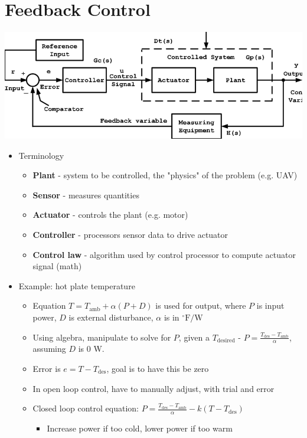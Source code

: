 \documentclass{article}
\begin{document}
\section*{Feedback Control}
\begin{center}
\includegraphics[scale=0.5]{closed-loop.png}
\end{center}
\begin{itemize}
\item Terminology
\begin{itemize}
\item \textbf{Plant}  - system to be controlled, the "physics" of the problem (e.g. UAV)
\item \textbf{Sensor} - measures quantities
\item \textbf{Actuator} - controls the plant (e.g. motor)
\item \textbf{Controller} - processors sensor data to drive actuator
\item \textbf{Control law} - algorithm used by control processor to compute actuator signal (math)
\end{itemize}
\item Example: hot plate temperature
\begin{itemize}
\item Equation $T=T_\text{amb}+\alpha(P+D)$ is used for output, where $P$ is input power, $D$ is external disturbance, $\alpha$ is in $^\circ\text{F}/\text{W}$
\item Using algebra, manipulate to solve for $P$, given a $T_\text{desired}$ - $P=\frac{T_\text{des}-T_\text{amb}}{\alpha}$, assuming $D$ is 0 W.
\item Error is $e=T-T_\text{des}$, goal is to have this be zero
\item In open loop control, have to manually adjust, with trial and error
\item Closed loop control equation:  $P=\frac{T_\text{des}-T_\text{amb}}{\alpha}-k(T-T_\text{des})$
\begin{itemize}
\item Increase power if too cold, lower power if too warm

\end{itemize}
\end{itemize}
\end{itemize}
\end{document}
